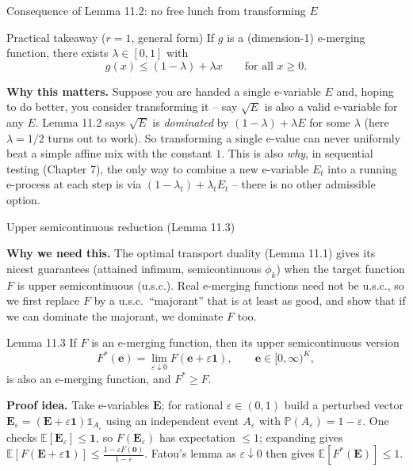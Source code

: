 \documentclass[aspectratio=169,10pt]{beamer}
\newcommand{\PP}{\mathbb{P}}
\newcommand{\EE}{\mathbb{E}}
\newcommand{\1}{\mathbb{1}}
\begin{document}
\begin{frame}[allowframebreaks]{Consequence of Lemma 11.2: no free lunch from transforming $E$}

\begin{block}{Practical takeaway ($r=1$, general form)}
If $g$ is a (dimension-1) e-merging function, there exists $\lambda\in[0,1]$ with
\[
g(x) \le (1-\lambda) + \lambda x \qquad \text{for all } x \ge 0.
\]
\end{block}

\textbf{Why this matters.} Suppose you are handed a single e-variable $E$ and, hoping to do better, you consider transforming it -- say $\sqrt{E}$ is also a valid e-variable for any $E$. Lemma 11.2 says $\sqrt{E}$ is \emph{dominated} by $(1-\lambda)+\lambda E$ for some $\lambda$ (here $\lambda = 1/2$ turns out to work). So transforming a single e-value can never uniformly beat a simple affine mix with the constant $1$. This is also \emph{why}, in sequential testing (Chapter 7), the only way to combine a new e-variable $E_t$ into a running e-process at each step is via $(1-\lambda_t) + \lambda_t E_t$ -- there is no other admissible option.

\end{frame}

\begin{frame}[allowframebreaks]{Upper semicontinuous reduction (Lemma 11.3)}

\textbf{Why we need this.} The optimal transport duality (Lemma 11.1) gives its nicest guarantees (attained infimum, semicontinuous $\phi_k$) when the target function $F$ is upper semicontinuous (u.s.c.). Real e-merging functions need not be u.s.c., so we first replace $F$ by a u.s.c.\ ``majorant'' that is at least as good, and show that if we can dominate the majorant, we dominate $F$ too.

\begin{block}{Lemma 11.3}
If $F$ is an e-merging function, then its upper semicontinuous version
\[
F^*(\mathbf{e}) = \lim_{\varepsilon \downarrow 0} F(\mathbf{e}+\varepsilon\mathbf{1}), \qquad \mathbf{e} \in [0,\infty)^K,
\]
is also an e-merging function, and $F^* \ge F$.
\end{block}

\textbf{Proof idea.} Take e-variables $\mathbf{E}$; for rational $\varepsilon\in(0,1)$ build a perturbed vector $\mathbf{E}_\varepsilon = (\mathbf{E}+\varepsilon\mathbf{1})\1_{A_\varepsilon}$ using an independent event $A_\varepsilon$ with $\PP(A_\varepsilon)=1-\varepsilon$. One checks $\EE[\mathbf{E}_\varepsilon]\le\mathbf{1}$, so $F(\mathbf{E}_\varepsilon)$ has expectation $\le 1$; expanding gives $\EE[F(\mathbf{E}+\varepsilon\mathbf{1})] \le \frac{1-\varepsilon F(\mathbf{0})}{1-\varepsilon}$. Fatou's lemma as $\varepsilon\downarrow 0$ then gives $\EE[F^*(\mathbf{E})]\le 1$.

\end{frame}
\end{document}
